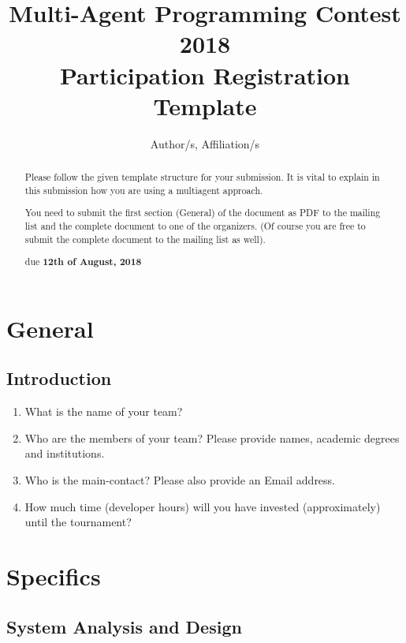\documentclass{article}
\begin{document}
\title{Multi-Agent Programming Contest 2018\\Participation Registration Template}
\author{Author/s, Affiliation/s}
\maketitle

\begin{abstract}
  Please follow the given template structure for your submission. It is vital to explain in this submission how you are using a multiagent approach.

  You need to submit the first section (General) of the document as PDF to the mailing list and the complete document to one of the organizers. (Of course you are free to submit the complete document to the mailing list as well).

  \begin{center}
    due \textbf{12th of August, 2018}
  \end{center}
\end{abstract}


\section*{General}

\subsection*{Introduction}

\begin{enumerate}
  \item What is the name of your team?
  \item Who are the members of your team? Please provide names, academic
    degrees and institutions.
  \item Who is the main-contact? Please also provide an Email address.
  \item How much time (developer hours) will you have invested (approximately)
    until the tournament?
\end{enumerate}

\section*{Specifics}

\subsection*{System Analysis and Design}
\end{document}

